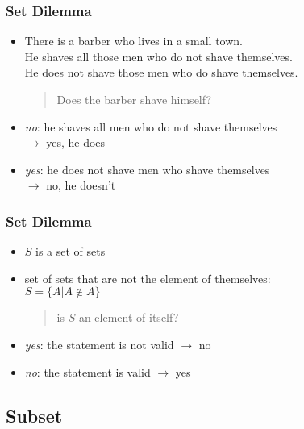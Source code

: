 \documentclass[dvipsnames]{beamer}
\begin{document}
\begin{frame}
  \frametitle{Set Dilemma}

  \begin{itemize}
    \item There is a barber who lives in a small town.\\
      He shaves all those men who do not shave themselves.\\
      He does not shave those men who do shave themselves.

    \begin{quote}
      Does the barber shave himself?
    \end{quote}

    \pause
    \item \emph{no}: he shaves all men who do not shave themselves\\
      $\rightarrow$ yes, he does

    \pause
    \item \emph{yes}: he does not shave men who shave themselves\\
      $\rightarrow$ no, he doesn't
  \end{itemize}
\end{frame}

\begin{frame}
  \frametitle{Set Dilemma}

  \begin{itemize}
    \item $S$ is a set of sets

    \pause
    \item set of sets that are not the element of themselves:\\
      $S = \{ A | A \notin A \}$

    \pause
    \begin{quote}
      is $S$ an element of itself?
    \end{quote}

    \pause
    \item \emph{yes}: the statement is not valid $\rightarrow$ no

    \pause
    \item \emph{no}: the statement is valid $\rightarrow$ yes
  \end{itemize}
\end{frame}

\subsection{Subset}
\end{document}

